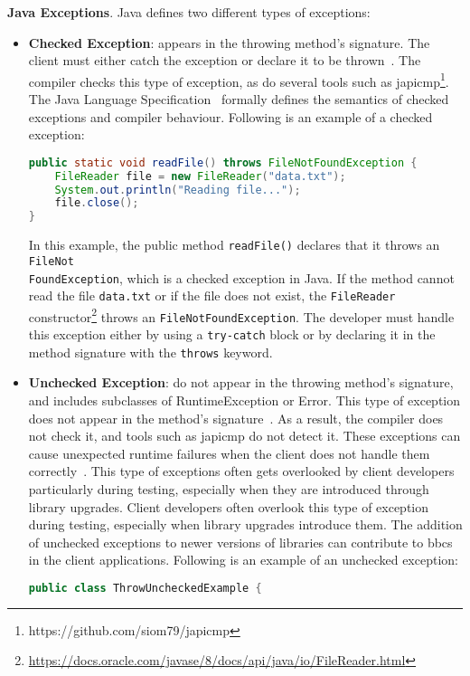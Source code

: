 \textbf{Java Exceptions}. Java defines two different types of exceptions:
\begin{itemize}
    \item \textbf{Checked Exception}: appears in the throwing method's signature. The client must either catch the exception or declare it to be
    thrown~\cite{Sousa2020evolution}. The compiler checks this type of exception, as do several tools
    such as japicmp\footnote{https://github.com/siom79/japicmp}. The Java Language Specification~\cite{Gosling2021java}
    formally defines the semantics of checked exceptions and compiler behaviour. Following is an example
    of a checked exception:
    \begin{lstlisting}[language=java]
public static void readFile() throws FileNotFoundException {
    FileReader file = new FileReader("data.txt");
    System.out.println("Reading file...");
    file.close();
}
    \end{lstlisting}
    In this example, the public method \texttt{readFile()} declares that it throws an \texttt{FileNot\\FoundException},
    which is a checked exception in Java. If the method cannot read the file \texttt{data.txt}
    or if the file does not exist, the \texttt{FileReader} constructor\footnote{\url{https://docs.oracle.com/javase/8/docs/api/java/io/FileReader.html}} throws an \texttt{FileNotFoundException}.
    The developer must handle this exception either by using a \texttt{try-catch} block or by declaring
    it in the method signature with the \texttt{throws} keyword.

    \item \textbf{Unchecked Exception}: do not appear in the throwing method's
    signature, and includes subclasses of RuntimeException or Error. This type
    of exception does not appear in the method's signature~\cite{Asaduzzaman2017}. As a result, the
    compiler does not check it, and tools such as japicmp do not detect it. These exceptions
    can cause unexpected runtime failures when the client does not handle them correctly~\cite{Padua2017}.
    This type of exceptions often gets overlooked by client developers particularly during testing,
    especially when they are introduced through library upgrades. Client developers often overlook
    this type of exception during testing, especially when library upgrades introduce them. The
    addition of unchecked exceptions to newer versions of libraries can contribute to \gls{bbc}s in
    the client applications. Following is an example of an unchecked exception:
    \begin{lstlisting}[language=java]
public class ThrowUncheckedExample {


\end{lstlisting}
\end{itemize}
